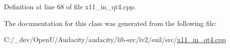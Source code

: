 Definition at line 68 of file x11\+\_\+in\+\_\+qt4.\+cpp.



The documentation for this class was generated from the following file\+:\begin{DoxyCompactItemize}
\item 
C\+:/\+\_\+dev/\+Open\+U/\+Audacity/audacity/lib-\/src/lv2/suil/src/\hyperlink{x11__in__qt4_8cpp}{x11\+\_\+in\+\_\+qt4.\+cpp}\end{DoxyCompactItemize}
